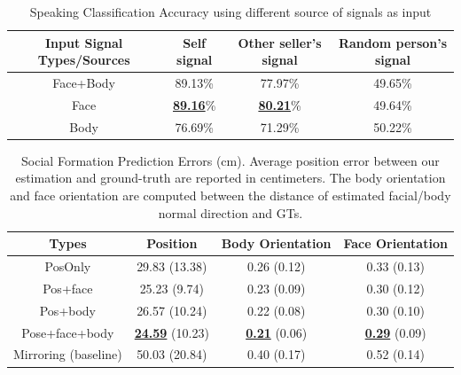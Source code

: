\begin{table}[t]
	\centering
	\begin{tabular}{c| c| c| c}
		\hline
		Input Signal Types/Sources & Self signal & Other seller's signal & Random person's signal\\
		\hline
		Face+Body & 89.13\% & 77.97\% & 49.65\%\\       %
				\hline
		Face & \underline {\textbf{89.16}}\% & \underline {\textbf{80.21}}\% & 49.64\%\\       %
				\hline
		Body & 76.69\% & 71.29\% & 50.22\%\\       %
		\hline
	\end{tabular}
	\caption{Speaking Classification Accuracy using different source of signals as input\label{table:speaking_class}}
\end{table}

\begin{table}[t]
	\centering
	\begin{tabular}{c| c| c| c}
		\hline
		Types & Position & Body Orientation & Face Orientation\\
		\hline
		PosOnly & 29.83 (13.38) & 0.26 (0.12) & 0.33 (0.13) \\
		\hline
		Pos+face & 25.23 (9.74) & 0.23 (0.09) & 0.30 (0.12) \\
		\hline
		Pos+body & 26.57 (10.24) & 0.22 (0.08) & 0.30 (0.10) \\
		\hline
		Pose+face+body & \underline {\textbf{24.59}} (10.23) &  \underline {\textbf{0.21}} (0.06) &  \underline {\textbf{0.29}} (0.09) \\
		\hline
		\hline
		Mirroring (baseline) &  50.03 (20.84) & 0.40 (0.17) & 0.52 (0.14) \\
	\end{tabular}
	\caption{Social Formation Prediction Errors (cm). Average position error between our estimation and ground-truth are reported in centimeters. The body orientation and face orientation are computed between the distance of estimated facial/body normal direction and GTs.\label{table:predForm_errors}}
\end{table}


